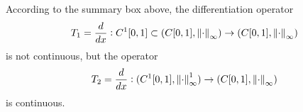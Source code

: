 \begin{summary}
	According to the summary box above, the differentiation operator 
	\[ T_1 = \frac{d}{dx}: C^1[0,1]\subset (C[0,1],\norm{\cdot}_\infty) \to (C[0,1],\norm{\cdot}_\infty) \]
	is not continuous, but the operator
	\[ T_2 = \frac{d}{dx}: (C^1[0,1],\norm{\cdot}_\infty^1) \to (C[0,1],\norm{\cdot}_\infty) \]
	is continuous.
\end{summary}



